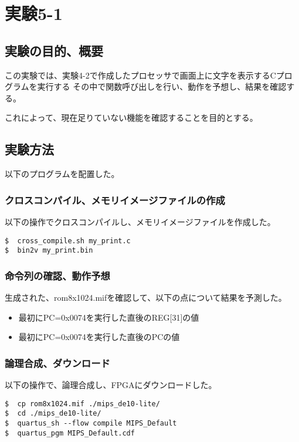 \section{実験5-1}
\subsection{実験の目的、概要}
この実験では、実験4-2で作成したプロセッサで画面上に文字を表示するCプログラムを実行する
その中で関数呼び出しを行い、動作を予想し、結果を確認する。

これによって、現在足りていない機能を確認することを目的とする。

\subsection{実験方法}
以下のプログラムを配置した。


\subsubsection{クロスコンパイル、メモリイメージファイルの作成}
以下の操作でクロスコンパイルし、メモリイメージファイルを作成した。
\begin{lstlisting}[caption={クロスコンパイル、メモリイメージファイルの作成},label={クロスコンパイル、メモリイメージファイルの作成5-1}]
$  cross_compile.sh my_print.c
$  bin2v my_print.bin
\end{lstlisting}

\subsubsection{命令列の確認、動作予想}
生成された、rom8x1024.mifを確認して、以下の点について結果を予測した。
\begin{itemize}
  \item 最初にPC=0x0074を実行した直後のREG[31]の値
  \item 最初にPC=0x0074を実行した直後のPCの値
\end{itemize}

\subsubsection{論理合成、ダウンロード}
以下の操作で、論理合成し、FPGAにダウンロードした。
\begin{lstlisting}[caption={論理合成、ダウンロード},label={論理合成、ダウンロード5-1}]
$  cp rom8x1024.mif ./mips_de10-lite/
$  cd ./mips_de10-lite/
$  quartus_sh --flow compile MIPS_Default
$  quartus_pgm MIPS_Default.cdf
\end{lstlisting}


